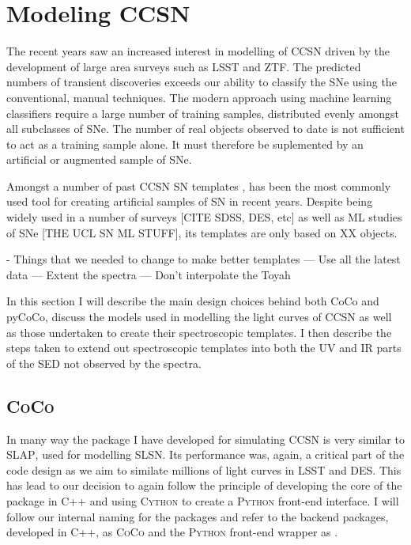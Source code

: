 \section{Modeling CCSN}
The recent years saw an increased interest in modelling of CCSN driven by the development of large area surveys such as LSST and ZTF. The predicted numbers of transient discoveries exceeds our ability to classify the SNe using the conventional, manual techniques. The modern approach using machine learning classifiers require a large number of training samples, distributed evenly amongst all subclasses of SNe. The number of real objects observed to date is not sufficient to act as a training sample alone. It must therefore be suplemented by an artificial or augmented sample of SNe.

Amongst a number of past CCSN SN templates \citep{Schlegel1995,Nugent2006}, \citet{Kessler2009} has been the most commonly used tool for creating artificial samples of SN in recent years. Despite being widely used in a number of surveys [CITE SDSS, DES, etc] as well as ML studies of SNe \citep{Kessler2010} [THE UCL SN ML STUFF], its templates are only based on XX objects.


- Things that we needed to change to make better templates
--- Use all the latest data
--- Extent the spectra
--- Don't interpolate the Toyah

In this section I will describe the main design choices behind both CoCo and pyCoCo, discuss the models used in modelling the light curves of CCSN as well as those undertaken to create their spectroscopic templates. I then describe the steps taken to extend out spectroscopic templates into both the UV and IR parts of the SED not observed by the spectra.

\subsection{\textsc{CoCo}}
In many way the package I have developed for simulating CCSN is very similar to \textsc{SLAP}, used for modelling SLSN. Its performance was, again, a critical part of the code design as we aim to similate millions of light curves in LSST and DES. This has lead to our decision to again follow the principle of developing the core of the package in \textsc{C++} and using \textsc{Cython} to create a \textsc{Python} front-end interface. I will follow our internal naming for the packages and refer to the backend packages, developed in \textsc{C++}, as \textsc{CoCo} and the \textsc{Python} front-end wrapper as .

